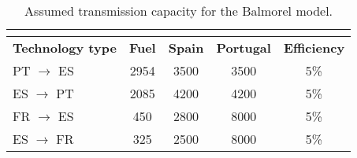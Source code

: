 \documentclass{article}
\begin{document}
\begin{table}[htbp]
	\caption{Assumed transmission capacity for the Balmorel model.}
	\centering
	\begin{tabular}{l|c|c|c|c}
		\hline
		\multicolumn{2}{c|}{}                    & \multicolumn{2}{c|}{\thead{\textbf{Capacity [MW]}}} & \textbf{}           \\
		\hline
		\textbf{Technology type} & \textbf{Fuel} & \textbf{Spain} & \textbf{Portugal}                  & \textbf{Efficiency} \\
		\hline
		PT $\rightarrow$ ES      & 2954          & 3500           & 3500                               & 5\%                 \\
		ES $\rightarrow$ PT      & 2085          & 4200           & 4200                               & 5\%                 \\
		\hline
		FR $\rightarrow$ ES      & 450           & 2800           & 8000                               & 5\%                 \\
		ES $\rightarrow$ FR      & 325           & 2500           & 8000                               & 5\%                 \\
		\hline
	\end{tabular}
	\label{tab:transcap}
\end{table}
\end{document}
